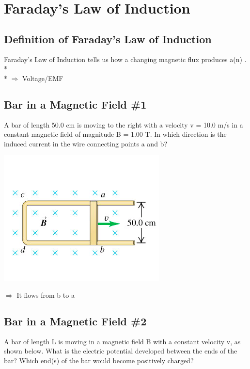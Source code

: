 \documentclass[11pt]{article}
\begin{document}


\pagebreak
\section{Faraday's Law of Induction}
\vspace{10pt}

\subsection{Definition of Faraday's Law of Induction}
Faraday's Law of Induction tells us how a changing magnetic flux produces a(n) \underline{\hspace{8mm}}.\\* \\*
$\Rightarrow$ Voltage/EMF


\subsection{Bar in a Magnetic Field \#1}
A bar of length 50.0 cm is moving to the right with a velocity v = 10.0 m/s in a constant magnetic field of magnitude B = 1.00 T.  In which direction is the induced current in the wire connecting points a and b?

\begin{center}
\includegraphics[scale=0.5]{Images/bar_and_rails.png}
\end{center}

$\Rightarrow$ It flows from b to a

\subsection{Bar in a Magnetic Field \#2}
A bar of length L is moving in a magnetic field B with a constant velocity v, as shown below.  What is the electric potential developed between the ends of the bar?  Which end(s) of the bar would become positively charged?
\end{document}
